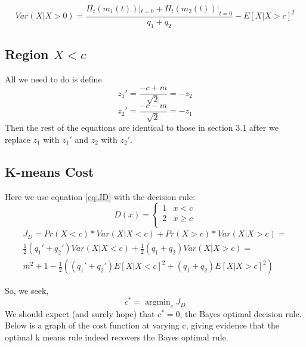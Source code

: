 \documentclass{article}
\DeclareMathOperator*{\argmin}{argmin}
\begin{document}
\[ Var(X|X>0) =  \frac{ H_t(m_1(t))|_{t=0} +  H_t(m_2(t))|_{t=0}}{q_1+q_2} -
E[X|X>c]^2 \]

\subsection{Region $X < c$}
All we need to do is define
\[ z_1' = \frac{-c+m}{\sqrt{2}} = -z_2\]
\[ z_2' = \frac{-c-m}{\sqrt{2}} = -z_1\]
Then the rest of the equations are identical to those in section 3.1 after we replace $z_1$ with $z_1'$ and $z_2$ with $z_2'$.

\subsection{K-means Cost}
Here we use equation \ref{eq:JD} with the decision rule:
 \[ 
D(x) =
  \begin{cases} 
      1 & x < c \\
      2 &  x\geq c \\
   \end{cases}
\]
\begin{equation}
\begin{split}
J_D = Pr(X<c) * Var(X|X<c) + Pr(X>c)*Var(X|X>c) = \\
\frac{1}{2}(q_1' + q_2') Var(X|X<c) + \frac{1}{2}(q_1 + q_2) Var(X|X>c) = \\
m^2 + 1 - \frac{1}{2}((q_1'+q_2')E[X|X<c]^2 + (q_1+q_2)E[X|X>c]^2)
\end{split}
\end{equation}


So, we seek, 
\[ c^* = \argmin_c J_D \]
We should expect (and surely hope) that $c^* = 0$, the Bayes optimal decision rule. Below is a graph of the cost function at varying c, giving evidence that the optimal k means rule indeed recovers the Bayes optimal rule.
\end{document}
